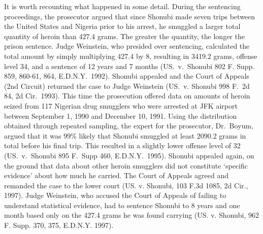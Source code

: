 \documentclass{article}
\begin{document}
It is worth recounting what happened in some detail. During the sentencing proceedings, the prosecutor argued that since Shonubi made seven trips between the United States and Nigeria prior to his arrest, he smuggled a larger total quantity of heroin than 427.4 grams. The greater the quantity, the longer the prison sentence.  
Judge Weinstein, who presided over sentencing, calculated the total amount by simply multiplying 427.4 by 8, resulting in 3419.2 grams, offense level 34, and a sentence of 12 years and 7 months (US.\ v.\ Shonubi 802 F. Supp. 859, 860-61, 864, E.D.N.Y.\ 1992). Shonubi appealed
and the Court of Appeals (2nd Circuit) returned the case to Judge Weinstein (US.\ v. Shonubi 998 F.\ 2d 84, 2d Cir.\ 1993). This time the prosecution offered data on amounts of heroin seized from 117 Nigerian drug smugglers %
who were arrested at JFK airport  between September 1, 1990 and December 10, 1991. Using the distribution obtained through repeated sampling, the expert for the prosecutor, Dr.\ Boyum, argued that  it was 99\% likely that Shonubi smuggled at least 2090.2 grams in total before his final trip. This resulted in a slightly lower offense level of 32 (US.\ v.\ Shonubi 895 F.\ Supp 460, E.D.N.Y.\ 1995).
Shonubi appealed again, on the ground that data about other heroin smugglers did not constitute `specific evidence' about how much he carried. The Court of Appeals agreed and remanded the case to the lower court (US. v. Shonubi, 103 F.3d 1085, 2d Cir., 1997). Judge Weinstein, who accused the Court of Appeals of failing to understand  statistical evidence, had to sentence Shonubi to 8 years and one month based only on the 427.4 grams he was found carrying (US. v. Shonubi, 962 F. Supp. 370, 375, E.D.N.Y. 1997). 
\end{document}
